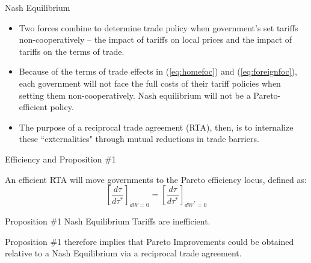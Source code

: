 \documentclass[aspectratio=169]{beamer}
\begin{document}
\begin{frame}{Nash Equilibrium}

\begin{itemize}
    \item<1-> Two forces combine to determine trade policy when government’s set tariffs non-cooperatively – the impact of tariffs on local prices and the impact of tariffs on the terms of trade.
    \item<2-> Because of the terms of trade effects in (\ref{eq:homefoc}) and (\ref{eq:foreignfoc}), each government will not face the full costs of their tariff policies when setting them non-cooperatively.  Nash equilibrium will not be a Pareto-efficient policy.
    \item<3-> The purpose of a reciprocal trade agreement (RTA), then, is to internalize these ``externalities" through mutual reductions in trade barriers.
\end{itemize}
    
\end{frame}


\begin{frame}{Efficiency and Proposition \#1}

An efficient RTA will move governments to the Pareto efficiency locus, defined as:
\begin{equation}
    \left[ \frac{d \tau}{d \tau^{*}} \right]_{dW = 0} = \left[ \frac{d \tau}{d \tau^{*}} \right]_{dW^{*} = 0}
    \label{eq:efficientlocus}
\end{equation}
\begin{theorem}{Proposition \#1}
    Nash Equilibrium Tariffs are inefficient.
\end{theorem}
Proposition \#1 therefore implies that Pareto Improvements could be obtained relative to a Nash Equilibrium via a reciprocal trade agreement. 

\end{frame}

\end{document}
